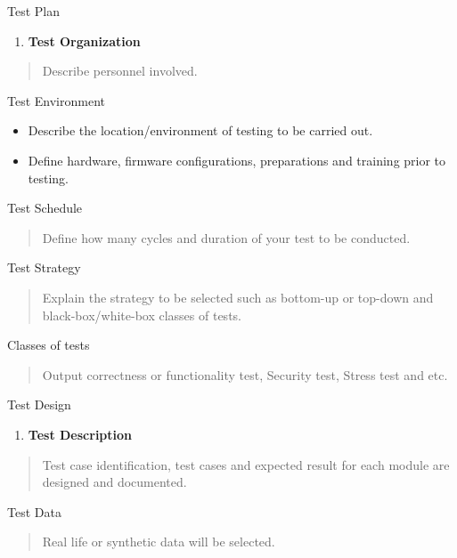 Test Plan

\begin{enumerate}
\def\labelenumi{\arabic{enumi}.}
\item
  \textbf{Test Organization}
\end{enumerate}

\begin{quote}
Describe personnel involved.
\end{quote}

Test Environment

\begin{itemize}
\item
  Describe the location/environment of testing to be carried out.
\item
  Define hardware, firmware configurations, preparations and training
  prior to testing.
\end{itemize}

Test Schedule

\begin{quote}
Define how many cycles and duration of your test to be conducted.
\end{quote}

Test Strategy

\begin{quote}
Explain the strategy to be selected such as bottom-up or top-down and
black-box/white-box classes of tests.
\end{quote}

Classes of tests

\begin{quote}
Output correctness or functionality test, Security test, Stress test and
etc.
\end{quote}

Test Design

\begin{enumerate}
\def\labelenumi{\arabic{enumi}.}
\item
  \textbf{Test Description}
\end{enumerate}

\begin{quote}
Test case identification, test cases and expected result for each module
are designed and documented.
\end{quote}

Test Data

\begin{quote}
Real life or synthetic data will be selected.
\end{quote}

